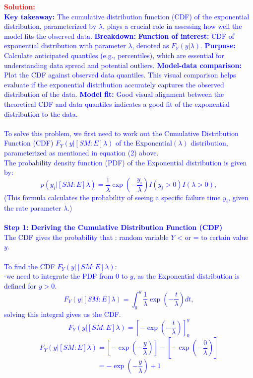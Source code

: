 \documentclass[12pt]{article}
\begin{document}
\begin{itemize}
\begin{itemize}
\begin{itemize}
\textcolor{red}{\textbf{Solution:}} \\
\textcolor{blue} {
\textbf{Key takeaway:} The cumulative distribution function (CDF) of the exponential distribution, parameterized by $\lambda$, plays a crucial role in assessing how well the model fits the observed data.
\textbf{Breakdown:}
\textbf{Function of interest:} CDF of exponential distribution with parameter $\lambda$, denoted as $F_Y(y | \lambda)$.
\textbf{Purpose:} Calculate anticipated quantiles (e.g., percentiles), which are essential for understanding data spread and potential outliers.
\textbf{Model-data comparison:} Plot the CDF against observed data quantiles. This visual comparison helps evaluate if the exponential distribution accurately captures the observed distribution of the data.
\textbf{Model fit:} Good visual alignment between the theoretical CDF and data quantiles indicates a good fit of the exponential distribution to the data.
}
\\ \\
\textcolor{blue}{%
To solve this problem, we first need to work out the Cumulative Distribution Function (CDF) $F_Y(y | [SM:E] \lambda)$ of the Exponential$(\lambda)$ distribution, parameterized as mentioned in equation (2) above. \\ The probability density function (PDF) of the Exponential distribution is given by:
\[
p(y_i | [SM:E] \lambda) = \frac{1}{\lambda} \exp\left(-\frac{y_i}{\lambda}\right) I(y_i > 0) I(\lambda > 0),
\]
(This formula calculates the probability of seeing a specific failure time \(y_i\), given the rate parameter \(\lambda\).)
\\
\\
{ \textbf{Step 1:  Deriving the Cumulative Distribution Function (CDF)}}
\\
The CDF gives the probability that : random variable \(Y\) \textless{} or = to certain value \(y\).
\\
\\
To find the CDF $F_Y(y | [SM:E] \lambda)$:
\\
-we need to integrate the PDF from 0 to $y$, as the Exponential distribution is defined for $y > 0$.
\[
F_Y(y | [SM:E] \lambda) = \int_0^y \frac{1}{\lambda} \exp\left(-\frac{t}{\lambda}\right) dt,
\]
solving this integral gives us the CDF.
\[
F_Y(y | [SM:E] \lambda) = \left[-\exp\left(-\frac{t}{\lambda}\right)\right]_{0}^{y}
\]
\[
F_Y(y | [SM:E] \lambda) = \left[-\exp\left(-\frac{y}{\lambda}\right)\right] - \left[-\exp\left(-\frac{0}{\lambda}\right)\right]
\]
\[
= -\exp\left(-\frac{y}{\lambda}\right) + 1
\]}
\end{itemize}
\end{itemize}
\end{itemize}
\end{document}
